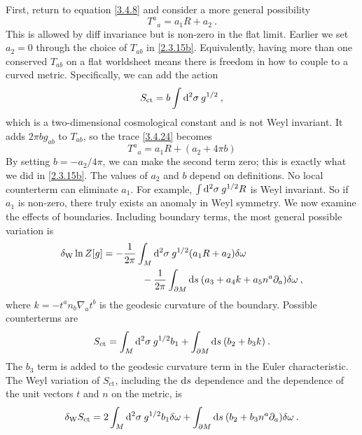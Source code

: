 First, return to equation \eqref{3.4.8} and consider a more general possibility    
\begin{equation}\label{3.4.24}
	T^{a}{}_{a}=a_{1} R+a_{2} \:. 
\end{equation}
This is allowed by diff invariance but is non-zero in the flat limit.    
Earlier we set $a_2=0$ through the choice of $T_{ab}$ in \eqref{2.3.15b}. Equivalently, having more than one conserved $T_{ab}$ on a flat worldsheet means there is freedom in how to couple to a curved metric.    
Specifically, we can add the action    
\begin{equation}
	S_{\mathrm{ct}}=b \int \mathrm{d}^{2} \sigma \: g^{1 / 2} \:, \label{3.4.25}
\end{equation}
which is a two-dimensional cosmological constant and is not Weyl invariant.    
It adds $2 \pi b g_{a b}$ to $T_{ab}$, so the trace \eqref{3.4.24} becomes    
\begin{equation}
	T^{a}{}_{a}=a_{1} R+\left(a_{2}+4 \pi b\right)
\end{equation}
By setting $b=-a_{2} / 4 \pi$, we can make the second term zero; this is exactly what we did in \eqref{2.3.15b}. The values of $a_2$ and $b$ depend on definitions.    
No local counterterm can eliminate $a_1$.    
For example, $\int \mathrm{d}^{2} \sigma\: g^{1 / 2} R$ is Weyl invariant. So if $a_1$ is non-zero, there truly exists an anomaly in Weyl symmetry.    
We now examine the effects of boundaries.    
Including boundary terms, the most general possible variation is    
\begin{align}
	\delta_{\mathrm{W}} \ln Z[g] &=-\frac{1}{2 \pi} \int_{M} \mathrm{d}^{2} \sigma\: g^{1 / 2} (a_{1} R+a_{2}) \delta \omega  \nonumber \\
	&\qquad \qquad -\frac{1}{2 \pi} \int_{\partial M} \mathrm{d} s\: (a_{3}+a_{4} k+a_{5} n^{a} \partial_{a}) \delta \omega \:, \label{3.4.27}
\end{align}
where $k=-t^{a} n_{b} \nabla_{a} t^{b}$ is the geodesic curvature of the boundary.    
Possible counterterms are    
\begin{equation}
	S_{\mathrm{ct}}=\int_{M} \mathrm{d}^{2} \sigma \: g^{1 / 2} b_{1}+\int_{\partial M} \mathrm{d} s\: (b_{2}+b_{3} k) \:. \label{3.4.28}
\end{equation}
The $b_3$ term is added to the geodesic curvature term in the Euler characteristic.    
The Weyl variation of $S_{\mathrm{ct}}$, including the $\mathrm{d} s$ dependence and the dependence of the unit vectors $t$ and $n$ on the metric, is    
\begin{equation}
	\delta_{\mathrm{W}} S_{\mathrm{ct}}=2 \int_{M} \mathrm{d}^{2} \sigma \: g^{1 / 2} b_{1} \delta \omega + 
	\int_{\partial M} \mathrm{d} s\: (b_{2}+b_{3} n^{a} \partial_{a}) \delta \omega \:.
	\label{3.4.29} \end{equation}
